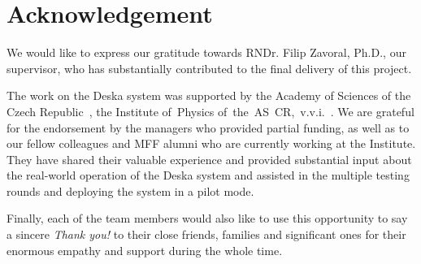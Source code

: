 \documentclass[deska]{subfiles}
\begin{document}
\chapter*{Acknowledgement}
\label{sec:acknowledgement}

We would like to express our gratitude towards RNDr. Filip Zavoral, Ph.D., our supervisor, who has substantially
contributed to the final delivery of this project.

The work on the Deska system was supported by the Academy of Sciences of the Czech Republic~\cite{ascr}, the Institute
of~Physics of~the~AS~CR,~v.v.i.~\cite{fzu}.  We are grateful for the endorsement by the managers who provided partial
funding, as well as to our fellow colleagues and MFF alumni who are currently working at the Institute.  They have
shared their valuable experience and provided substantial input about the real-world operation of the Deska system and
assisted in the multiple testing rounds and deploying the system in a pilot mode.

Finally, each of the team members would also like to use this opportunity to say a sincere {\em Thank you!} to their
close friends, families and significant ones for their enormous empathy and support during the whole time.
\end{document}
